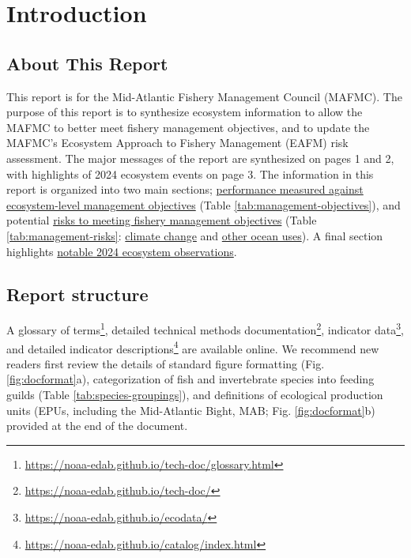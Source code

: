 \documentclass[
  10pt,
]{article}
\author{}
\date{\vspace{-2.5em}}
\begin{document}
\setcounter{page}{4}
\thispagestyle{fancy}

\section{Introduction}\label{introduction}

\subsection{About This Report}\label{about-this-report}

This report is for the Mid-Atlantic Fishery Management Council (MAFMC). The purpose of this report is to synthesize ecosystem information to allow the MAFMC to better meet fishery management objectives, and to update the MAFMC's Ecosystem Approach to Fishery Management (EAFM) risk assessment. The major messages of the report are synthesized on pages 1 and 2, with highlights of 2024 ecosystem events on page 3.
The information in this report is organized into two main sections; \hyperref[performance-relative-to-fishery-management-objectives]{performance measured against ecosystem-level management objectives} (Table \ref{tab:management-objectives}), and potential \hyperref[risks-to-meeting-fishery-management-objectives]{risks to meeting fishery management objectives} (Table \ref{tab:management-risks}: \hyperref[climate-and-ecosystem-change]{climate change} and \hyperref[other-ocean-uses-offshore-wind]{other ocean uses}). A final section highlights \hyperref[highlights]{notable 2024 ecosystem observations}.

\subsection{Report structure}\label{report-structure}

A glossary of terms\footnote{\url{https://noaa-edab.github.io/tech-doc/glossary.html}}, detailed technical methods documentation\footnote{\url{https://noaa-edab.github.io/tech-doc/}}, indicator data\footnote{\url{https://noaa-edab.github.io/ecodata/}}, and detailed indicator descriptions\footnote{\url{https://noaa-edab.github.io/catalog/index.html}} are available online. We recommend new readers first review the details of standard figure formatting (Fig. \ref{fig:docformat}a), categorization of fish and invertebrate species into feeding guilds (Table \ref{tab:species-groupings}), and definitions of ecological production units (EPUs, including the Mid-Atlantic Bight, MAB; Fig. \ref{fig:docformat}b) provided at the end of the document.
\end{document}
